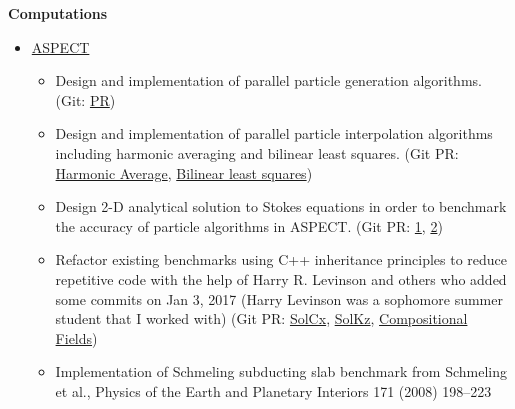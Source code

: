 \documentclass[11pt]{ltxdoc}
\begin{document}
\begin{description}
\begin{description}
\begin{itemize}
\begin{itemize}
        \end{itemize}
  
      \end{itemize}  

    \item[] \textbf{Computations}
    
      \vskip 06pt
      

      \begin{itemize}
      	
        \item \href{https://geodynamics.org/cig/software/aspect/}{ASPECT}
              
          \begin{itemize}        
            
            \item Design and implementation of parallel particle generation algorithms. (Git: \href{https://github.com/geodynamics/aspect/pull/1266}{PR})
           
            \item Design and implementation of parallel particle interpolation algorithms including harmonic averaging and bilinear least squares. (Git PR: \href{https://github.com/geodynamics/aspect/pull/1949}{Harmonic Average}, \href{https://github.com/geodynamics/aspect/pull/1554}{Bilinear least squares})
           
            \item Design 2-D analytical solution to Stokes equations in order to benchmark the accuracy of particle algorithms in ASPECT. (Git PR: \href{https://github.com/EGP-CIG-REU/aspect/tree/EGP_HVL_benchmark/benchmark/egp_hvl}{1}, \href{https://github.com/EGP-CIG-REU/aspect/tree/simple_annulus_benchmark/benchmarks/simple_annulus}{2})
           
            \item Refactor existing benchmarks using C++ inheritance principles to reduce repetitive code with the help of Harry R. Levinson and others who added some commits on Jan 3, 2017 (Harry Levinson was a sophomore summer student  that I worked with) (Git PR: \href{https://github.com/geodynamics/aspect/pull/1498}{SolCx}, \href{https://github.com/geodynamics/aspect/pull/1539}{SolKz}, \href{https://github.com/geodynamics/aspect/pull/1345}{Compositional Fields})
            
            \item Implementation of Schmeling subducting slab benchmark from Schmeling et al., Physics of the Earth and Planetary Interiors 171 (2008) 198--223 
            

\end{itemize}
\end{itemize}
\end{description}
\end{description}
\end{document}
